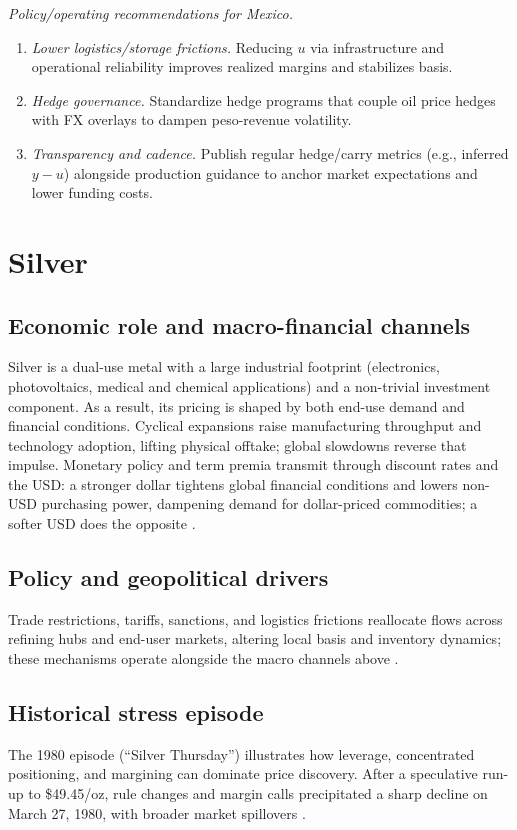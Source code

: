 \documentclass[11pt,a4paper]{article} %
\let\oldsection\section
\renewcommand{\section}{%
    \clearpage
    \thispagestyle{myfancy}%
    \oldsection
  }
\begin{document}
\textit{Policy/operating recommendations for Mexico.}
\begin{enumerate}
  \item \emph{Lower logistics/storage frictions.} Reducing \(u\) via infrastructure and operational reliability improves realized margins and stabilizes basis.
  \item \emph{Hedge governance.} Standardize hedge programs that couple oil price hedges with FX overlays to dampen peso-revenue volatility.
  \item \emph{Transparency and cadence.} Publish regular hedge/carry metrics (e.g., inferred \(y-u\)) alongside production guidance to anchor market expectations and lower funding costs.
\end{enumerate}



\section{Silver}

\subsection{Economic role and macro-financial channels}
Silver is a dual-use metal with a large industrial footprint (electronics, photovoltaics, medical and chemical applications) and a non-trivial investment component. As a result, its pricing is shaped by both end-use demand and financial conditions. Cyclical expansions raise manufacturing throughput and technology adoption, lifting physical offtake; global slowdowns reverse that impulse. Monetary policy and term premia transmit through discount rates and the USD: a stronger dollar tightens global financial conditions and lowers non-USD purchasing power, dampening demand for dollar-priced commodities; a softer USD does the opposite \citep{silver_institute_wss_2024,usgs_silver_mcs_2024,bis_usd_commodity_2023}.

\subsection{Policy and geopolitical drivers}
Trade restrictions, tariffs, sanctions, and logistics frictions reallocate flows across refining hubs and end-user markets, altering local basis and inventory dynamics; these mechanisms operate alongside the macro channels above \citep{silver_institute_wss_2024}.

\subsection{Historical stress episode}
The 1980 episode (“Silver Thursday”) illustrates how leverage, concentrated positioning, and margining can dominate price discovery. After a speculative run-up to \$49.45/oz, rule changes and margin calls precipitated a sharp decline on March 27, 1980, with broader market spillovers \citep{britannica_silver_thursday,nyt_1980_silver_thursday}.
\end{document}
